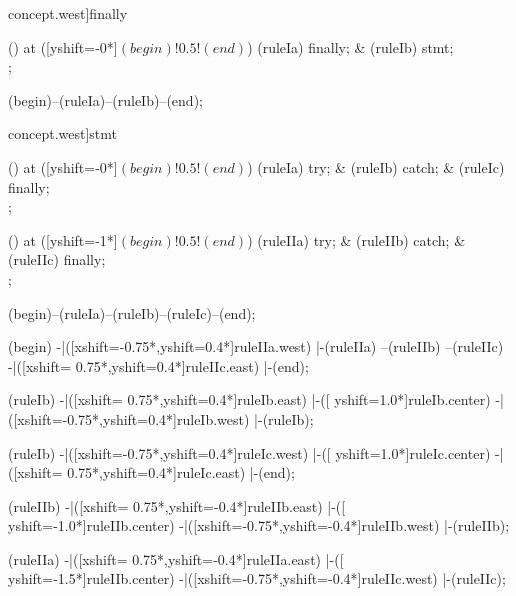 \begin{syntax}[[xshift=18mm]concept.west]{finally}
  
  \node[sequence,column sep=2.0cm] () at ([yshift=-0*\syntaxruledist]$(begin)!0.5!(end)$) {
    \node[terminal]    (ruleIa) {finally};
    &
    \node[nonterminal] (ruleIb) {stmt};
    \\
  };
  
  \draw[path] (begin)--(ruleIa)--(ruleIb)--(end);
\end{syntax}

\begin{syntax}[[xshift=18mm]concept.west]{stmt}
  
  \node[sequence,column sep=2.0cm] () at ([yshift=-0*\syntaxruledist]$(begin)!0.5!(end)$) {
    \node[terminal]    (ruleIa) {try};
    &
    \node[nonterminal] (ruleIb) {catch};
    &
    \node[nonterminal] (ruleIc) {finally};
    \\
  };
  
  \node[sequence,column sep=2.0cm] () at ([yshift=-1*\syntaxruledist]$(begin)!0.5!(end)$) {
    \node[terminal]    (ruleIIa) {try};
    &
    \node[nonterminal] (ruleIIb) {catch};
    &
    \node[nonterminal] (ruleIIc) {finally};
    \\
  };
  
  \draw[path] (begin)--(ruleIa)--(ruleIb)--(ruleIc)--(end);
  
  \draw[path] (begin)
            -|([xshift=-0.75*\syntaxruledist,yshift=0.4*\syntaxruledist]ruleIIa.west)
            |-(ruleIIa)
            --(ruleIIb)
            --(ruleIIc)
            -|([xshift= 0.75*\syntaxruledist,yshift=0.4*\syntaxruledist]ruleIIc.east)
            |-(end);
  
  \draw[path] (ruleIb)
            -|([xshift= 0.75*\syntaxruledist,yshift=0.4*\syntaxruledist]ruleIb.east)
            |-([                             yshift=1.0*\syntaxruledist]ruleIb.center)
            -|([xshift=-0.75*\syntaxruledist,yshift=0.4*\syntaxruledist]ruleIb.west)
            |-(ruleIb);
  
  \draw[path] (ruleIb)
            -|([xshift=-0.75*\syntaxruledist,yshift=0.4*\syntaxruledist]ruleIc.west)
            |-([                             yshift=1.0*\syntaxruledist]ruleIc.center)
            -|([xshift= 0.75*\syntaxruledist,yshift=0.4*\syntaxruledist]ruleIc.east)
            |-(end);
  
  \draw[path] (ruleIIb)
            -|([xshift= 0.75*\syntaxruledist,yshift=-0.4*\syntaxruledist]ruleIIb.east)
            |-([                             yshift=-1.0*\syntaxruledist]ruleIIb.center)
            -|([xshift=-0.75*\syntaxruledist,yshift=-0.4*\syntaxruledist]ruleIIb.west)
            |-(ruleIIb);
  
  \draw[path] (ruleIIa)
            -|([xshift= 0.75*\syntaxruledist,yshift=-0.4*\syntaxruledist]ruleIIa.east)
            |-([                             yshift=-1.5*\syntaxruledist]ruleIIb.center)
            -|([xshift=-0.75*\syntaxruledist,yshift=-0.4*\syntaxruledist]ruleIIc.west)
            |-(ruleIIc);
\end{syntax}
